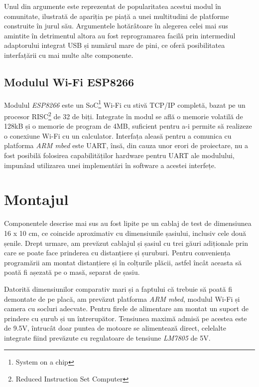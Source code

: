 Unul din argumente este reprezentat de popularitatea acestui modul în comunitate, ilustrată de apariția pe piață a unei multitudini de platforme construite în jurul său. Argumentele hotărâtoare în alegerea celei mai sus amintite în detrimentul altora au fost reprogramarea facilă prin intermediul adaptorului integrat USB și numărul mare de pini, ce oferă posibilitatea interfațării cu mai multe alte componente.

\subsection{Modulul Wi-Fi ESP8266}

Modulul \textit{ESP8266} este un SoC\footnote{System on a chip} Wi-Fi cu stivă TCP/IP completă, bazat pe un procesor RISC\footnote{Reduced Instruction Set Computer} de 32 de biți. Integrate în modul se află o memorie volatilă de 128kB și o memorie de program de 4MB, suficient pentru a-i permite să realizeze o conexiune Wi-Fi cu un calculator. Interfața aleasă pentru a comunica cu platforma \textit{ARM mbed} este UART, însă, din cauza unor erori de proiectare, nu a fost posibilă folosirea capabilităților hardware pentru UART ale modulului, impunând utilizarea unei implementări în software a acestei interfețe.


\section{Montajul}

Componentele descrise mai sus au fost lipite pe un cablaj de test de dimensiunea 16 x 10 cm, ce coincide aproximativ cu dimensiunile șasiului, inclusiv cele două șenile. Drept urmare, am prevăzut cablajul și șasiul cu trei găuri adiționale prin care se poate face prinderea cu distanțiere și șuruburi. Pentru conveniența programării am montat distanțiere și în colțurile plăcii, astfel încât aceasta să poată fi așezată pe o masă, separat de șasiu.


Datorită dimensiunilor comparativ mari și a faptului că trebuie să poată fi demontate de pe placă, am prevăzut platforma \textit{ARM mbed}, modulul Wi-Fi și camera cu socluri adecvate. Pentru firele de alimentare am montat un suport de prindere cu șurub și un întrerupător. Tensiunea maximă admisă pe acestea este de 9.5V, întrucât doar puntea de motoare se alimentează direct, celelalte integrate fiind prevăzute cu regulatoare de tensiune \textit{LM7805} de 5V.

